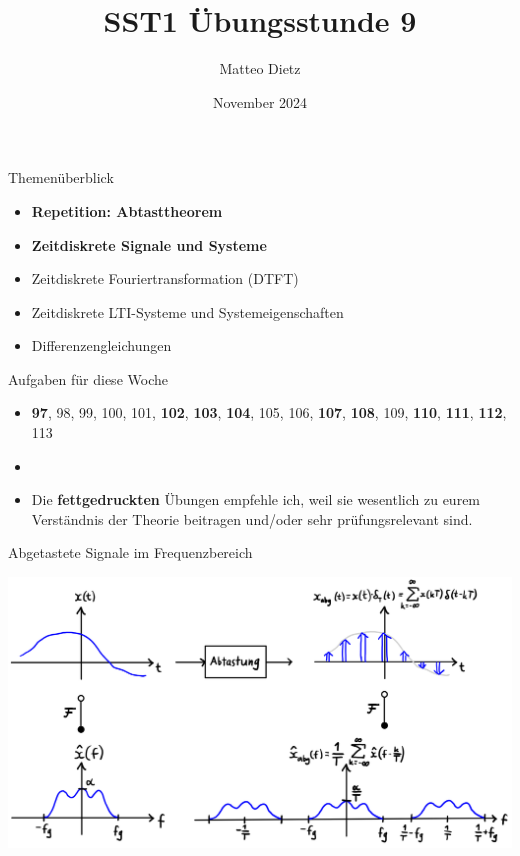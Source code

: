 \documentclass[14pt, aspectratio=169, handout]{beamer}
\title{SST1 Übungsstunde 9}
\author{Matteo Dietz}
\date{November 2024}
\begin{document}
\maketitle

\begin{frame}{Themenüberblick}
    \begin{itemize}
        \item \textbf{Repetition: Abtasttheorem}
        \item \textbf{Zeitdiskrete Signale und Systeme}
        \item[] Zeitdiskrete Fouriertransformation (DTFT)
        \item[] Zeitdiskrete LTI-Systeme und Systemeigenschaften
        \item[] Differenzengleichungen
    \end{itemize}
\end{frame}


\begin{frame}{Aufgaben für diese Woche}
    \begin{itemize}
        \item[] \textbf{97}, 98, 99, 100, 101, \textbf{102}, \textbf{103}, \textbf{104}, 105, 106, \textbf{107}, \textbf{108}, 109, \textbf{110}, \textbf{111}, \textbf{112}, 113
        \item[] 
        \item[] Die \textbf{fettgedruckten} Übungen empfehle ich, weil sie wesentlich zu eurem Verständnis der Theorie beitragen und/oder sehr prüfungsrelevant sind.
    \end{itemize}
\end{frame}


\begin{frame}{Abgetastete Signale im Frequenzbereich}
    \begin{center}
        \includegraphics[width=0.92\linewidth]{figures/abtastung2.jpg}
    \end{center}
\end{frame}
\end{document}
